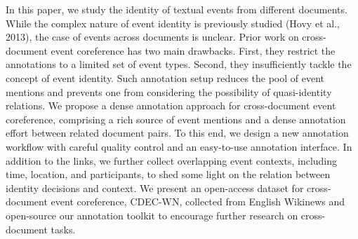 In this paper, we study the identity of textual events from different documents. While the complex nature of event identity is previously studied (Hovy et al., 2013), the case of events across documents is unclear. Prior work on cross-document event coreference has two main drawbacks. First, they restrict the annotations to a limited set of event types. Second, they insufficiently tackle the concept of event identity.  Such annotation setup reduces the pool of event mentions and prevents one from considering the possibility of quasi-identity relations. We propose a dense annotation approach for cross-document event coreference, comprising a rich source of event mentions and a dense annotation effort between related document pairs. To this end, we design a new annotation workflow with careful quality control and an easy-to-use annotation interface. In addition to the links, we further collect overlapping event contexts, including time, location, and participants, to shed some light on the relation between identity decisions and context. We present an open-access dataset for cross-document event coreference, CDEC-WN, collected from English Wikinews and open-source our annotation toolkit to encourage further research on cross-document tasks.
